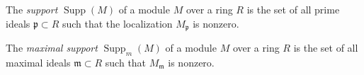 \documentclass[12pt]{article}
\newcommand{\m}{{\mathfrak{m}}}
\newcommand{\p}{{\mathfrak{p}}}
\newcommand{\0}{\bf{0}}
\newcommand{\<}{\langle}
\renewcommand{\>}{\rangle}
\newcommand{\Supp}{\operatorname{Supp}}
\begin{document}
The {\em support} $\Supp(M)$ of a module $M$ over a ring $R$ is the set of all prime ideals $\p \subset R$ such that the localization $M_\p$ is nonzero.

The {\em maximal support} $\Supp_m(M)$ of a module $M$ over a ring $R$ is the set of all maximal ideals $\m \subset R$ such that $M_\m$ is nonzero.
\end{document}
